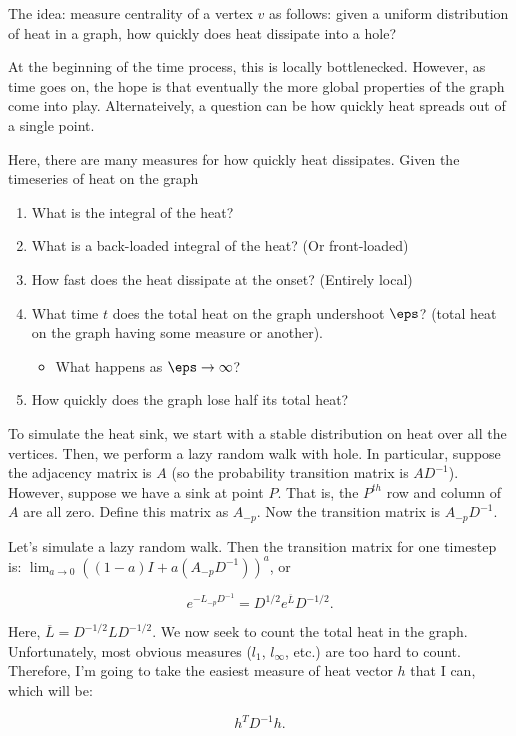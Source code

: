The idea: measure centrality of a vertex $v$ as follows: given a
uniform distribution of heat in a graph, how quickly does heat
dissipate into a hole?

At the beginning of the time process, this is locally
bottlenecked. However, as time goes on, the hope is that
eventually the more global properties of the graph come into
play. Alternateively, a question can be how quickly heat spreads
out of a single point.

Here, there are many measures for how quickly heat dissipates.
Given the timeseries of heat on the graph
\begin{enumerate}
\item What is the integral of the heat?
\item What is a back-loaded integral of the heat? (Or
    front-loaded)
\item How fast does the heat dissipate at the onset? (Entirely
    local)
\item  What time $t$ does the total heat on the graph undershoot
$\eps$? (total heat on the graph having some measure or another).
\begin{itemize}
\item What happens as $\eps \rightarrow \infty$?
\end{itemize}
\item How quickly does the graph lose half its total heat?
\end{enumerate}
To simulate the heat sink, we start with a stable distribution on
heat over all the vertices. Then, we perform a lazy random walk
with hole. In particular, suppose the adjacency matrix is $A$ (so
    the probability transition matrix is $AD^{-1}$).
However, suppose we have a sink at point $P$. That is, the
$P^{th}$ row and column of $A$ are all zero. Define this matrix as
$A_{-p}$. Now the transition matrix is $A_{-p}D^{-1}$.

Let's simulate a lazy random walk. Then the transition matrix for
one timestep is:
$\lim_{a \rightarrow 0} ((1-a)I + a(A_{-p}D^{-1}) )^a$, or 

\[ e^{-L_{-p}D^{-1}} = D^{1/2} e^{\overline{L}} D^{-1/2}. \]

Here, $\overline{L} = D^{-1/2} L D^{-1/2}$.
We now seek to count the total heat in the graph. Unfortunately,
most obvious measures ($l_1$, $l_\infty$, etc.) are too hard to
  count. Therefore, I'm going to take the easiest measure of heat
  vector $h$ that I can, which will be:

  \[ h^T D^{-1} h. \]


